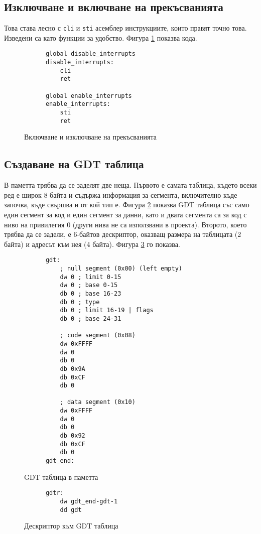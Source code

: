   \subsection{Изключване и включване на прекъсванията}
  Това става лесно с {\tt cli} и {\tt sti} асемблер инструкциите, които правят точно това. Изведени са като функции за удобство. Фигура \ref{fig:interrupt-disable} показва кода.

  \begin{figure}[ht]
    \centering
    \caption{Включване и изключване на прекъсванията}
    \begin{verbatim}
      global disable_interrupts
      disable_interrupts:
          cli
          ret

      global enable_interrupts
      enable_interrupts:
          sti
          ret
    \end{verbatim}
    \label{fig:interrupt-disable}
  \end{figure}

  \subsection{Създаване на GDT таблица}
  В паметта трябва да се заделят две неща. Първото е самата таблица, където всеки ред е широк 8 байта и съдържа информация за сегмента, включително къде започва, къде свършва и от кой тип е. Фигура \ref{fig:gdt} показва GDT таблица със само един сегмент за код и един сегмент за данни, като и двата сегмента са за код с ниво на привилегия 0 (други нива не са използвани в проекта). Второто, което трябва да се задели, е 6-байтов дескриптор, оказващ размера на таблицата (2 байта) и адресът към нея (4 байта). Фигура \ref{fig:gdtr} го показва.

  \begin{figure}[ht]
    \centering
    \begin{verbatim}
      gdt:
          ; null segment (0x00) (left empty)
          dw 0 ; limit 0-15
          dw 0 ; base 0-15
          db 0 ; base 16-23
          db 0 ; type
          db 0 ; limit 16-19 | flags
          db 0 ; base 24-31

          ; code segment (0x08)
          dw 0xFFFF
          dw 0
          db 0
          db 0x9A
          db 0xCF
          db 0

          ; data segment (0x10)
          dw 0xFFFF
          dw 0
          db 0
          db 0x92
          db 0xCF
          db 0
      gdt_end:
    \end{verbatim}
    \caption{GDT таблица в паметта}
    \label{fig:gdt}
  \end{figure}
  \begin{figure}[ht]
    \centering
    \begin{verbatim}
      gdtr:
          dw gdt_end-gdt-1
          dd gdt
    \end{verbatim}
    \caption{Дескриптор към GDT таблица}
    \label{fig:gdtr}
  \end{figure}

